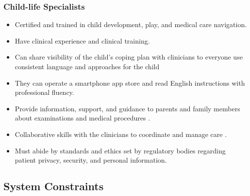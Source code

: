 \documentclass[12pt]{article}
\begin{document}
\subsubsection*{\textbf{Child-life Specialists}}
\begin{itemize}
    \item Certified and trained in child development, play, and medical care navigation.
    \item Have clinical experience and clinical training.
    \item Can share visibility of the child's coping plan with clinicians to everyone use 
    consistent language and approaches for the child
    \item They can operate a smartphone app store and read English instructions with 
    professional fluency.
    \item Provide information, support, and guidance to parents and family members about 
    examinations and medical procedures \cite{mayoChildLifeSpecialist}.
    \item Collaborative skills with the clinicians to coordinate and manage care \cite{mayoChildLifeSpecialist}.
    \item Must abide by standards and ethics set by regulatory bodies regarding patient privacy, 
    security, and personal information.
\end{itemize}

\subsection{System Constraints}
\end{document}
